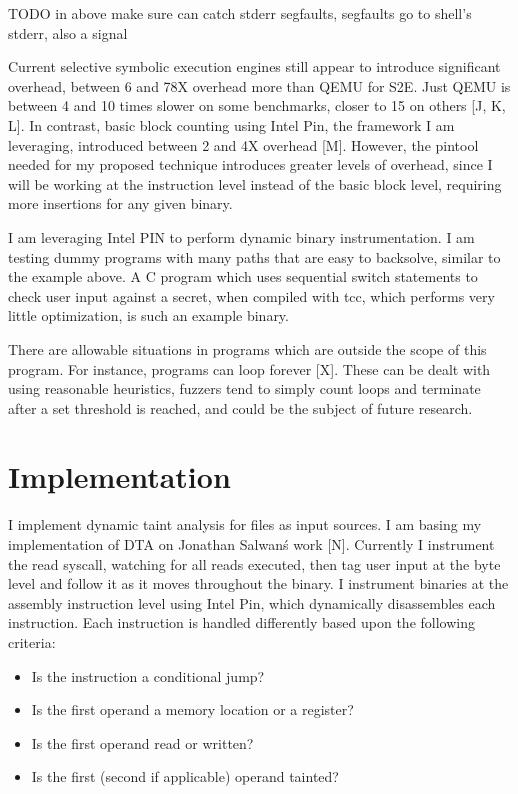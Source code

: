 \documentclass[11pt,expanded,copyright]{fsuthesis}
\begin{document}
TODO in above make sure can catch stderr segfaults, segfaults go to shell's stderr, also a signal

Current selective symbolic execution engines still appear to introduce significant overhead, between 6 and 78X overhead more than QEMU for S2E. Just QEMU is between 4 and 10 times slower on some benchmarks, closer to 15 on others [J, K, L]. In contrast, basic block counting using Intel Pin, the framework I am leveraging, introduced between 2 and 4X overhead [M]. However, the pintool needed for my proposed technique introduces greater levels of overhead, since I will be working at the instruction level instead of the basic block level, requiring more insertions for any given binary.

I am leveraging Intel PIN to perform dynamic binary instrumentation. I am testing dummy programs with many paths that are easy to backsolve, similar to the example above. A C program which uses sequential switch statements to check user input against a secret, when compiled with tcc, which performs very little optimization, is such an example binary. 

There are allowable situations in programs which are outside the scope of this program. For instance, programs can loop forever [X]. These can be dealt with using reasonable heuristics, fuzzers tend to simply count loops and terminate after a set threshold is reached, and could be the subject of future research.


\section{Implementation}

I implement dynamic taint analysis for files as input sources. I am basing my implementation of DTA on Jonathan Salwan\'s work [N]. Currently I instrument the read syscall, watching for all reads executed, then tag user input at the byte level and follow it as it moves throughout the binary. I instrument binaries at the assembly instruction level using Intel Pin, which dynamically disassembles each instruction. Each instruction is handled differently based upon the following criteria:

\begin{itemize}
	\item Is the instruction a conditional jump?
	\item Is the first operand a memory location or a register?
	\item Is the first operand read or written?
	\item Is the first (second if applicable) operand tainted?
\end{itemize}
	
\end{document}
